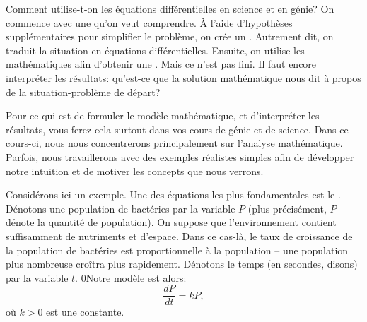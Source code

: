 Comment utilise-t-on les équations différentielles en science et en génie?
On commence avec une \emph{} qu'on veut comprendre.
À l'aide d'hypothèses supplémentaires pour simplifier le problème, on crée un \emph{}.
Autrement dit, on traduit la situation en équations différentielles.
Ensuite, on utilise les mathématiques afin d'obtenir une \emph{}.
Mais ce n'est pas fini.  Il faut encore interpréter les résultats: qu'est-ce que la solution mathématique
nous dit à propos de la situation-problème de départ?

Pour ce qui est de formuler le modèle mathématique, et d'interpréter les résultats, vous ferez cela surtout dans vos cours de génie et de science.
Dans ce cours-ci, nous nous concentrerons principalement sur l'analyse mathématique.
Parfois, nous travaillerons avec des exemples réalistes simples afin de développer notre intuition et de motiver les concepts que nous verrons.

Considérons ici un exemple.  Une des équations les plus fondamentales est le \emph{}.
Dénotons une population de bactéries par la variable $P$ (plus précisément, $P$ dénote la quantité de population).
On suppose que l'environnement contient suffisamment de nutriments et d'espace.
Dans ce cas-là, le taux de croissance de la population de bactéries est proportionnelle à la population --
une population plus nombreuse croîtra plus rapidement.
Dénotons le temps (en secondes, disons) par la variable $t$.
0Notre modèle est alors:
\begin{equation*}
	\frac{dP}{dt} = kP,
\end{equation*}
où $k > 0$ est une constante.

